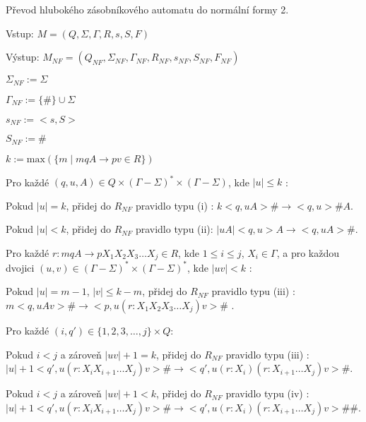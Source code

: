 \begin{Alg}
Převod hlubokého zásobníkového automatu do normální formy 2.

\begin{list}{}{\setlength\parsep{0cm} \setlength\itemsep{0cm} \setlength\leftmargin{1em}}
   \item Vstup: $M = (Q,\Sigma,\Gamma, R, s, S, F)$ 
   \item Výstup: $M_{NF} = (Q_{NF}, \Sigma_{NF}, {\Gamma}_{NF}, R_{NF}, s_{NF},  S_{NF}, F_{NF})$ \medskip
  
  \item \label{r1} ${\Sigma}_{NF} := \Sigma$
  \item ${\Gamma}_{NF} :=\{\#\} \cup \Sigma$
  \item $s_{NF} := <s,S>$
  \item $S_{NF} := \#$ \medskip

  \item $k := \mathrm{max}(\{m \mid mqA \rightarrow pv \in R\}) $ \medskip

  \item Pro každé $(q,u,A) \in Q \times (\Gamma - \Sigma)^* \times (\Gamma - \Sigma)$, kde $|u| \le k$ : \medskip

  \subitem Pokud $|u| = k$, přidej do $R_{NF}$ pravidlo typu (i) :
  \subitem $k <q,uA> \# \rightarrow <q,u> \# A$. \medskip

  \subitem Pokud $|u| < k$, přidej do $R_{NF}$ pravidlo typu (ii):
  \subitem $|uA| <q,u> A \rightarrow <q,uA> \#$. \medskip

  \item Pro každé $r : mqA \rightarrow p X_1 X_2 X_3 \dots X_j \in R$, kde $1 \le i \le j$, $X_i \in \Gamma$, a 
        pro každou dvojici $(u,v) \in (\Gamma - \Sigma)^* \times (\Gamma - \Sigma)^*$, kde $|uv| < k$ : \medskip

  \subitem Pokud $|u| = m - 1$, $|v| \le k-m$, přidej do $R_{NF}$ pravidlo typu (iii) :
  \subitem $m <q,uAv> \# \rightarrow <p,u (r : X_1 X_2 X_3 \dots X_j) v>\#$ . \medskip

  \subitem Pro každé $(i,q') \in \{1,2,3,\dots,j\} \times Q$: \medskip

  \subsubitem Pokud $i < j$ a zároveň $|uv|+1 = k$, přidej do $R_{NF}$ pravidlo typu (iii) :
  \subsubitem $|u|+1 <q',u(r : X_i X_{i+1} \dots X_j)v> \# \rightarrow <q',u(r : X_i) (r: X_{i+1} \dots X_j)v> \# $. \medskip

  \subsubitem Pokud $i < j$ a zároveň $|uv|+1 < k$, přidej do $R_{NF}$ pravidlo typu (iv) :
  \subsubitem $|u|+1 <q',u(r : X_i X_{i+1} \dots X_j)v> \# \rightarrow <q',u(r : X_i) (r: X_{i+1} \dots X_j)v> \#\# $. \medskip


\end{list}
\end{Alg}
